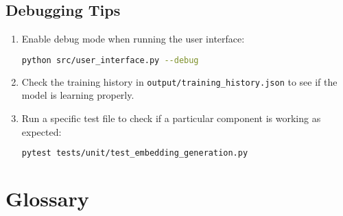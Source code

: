 \documentclass[12pt, a4paper, oneside]{book}
\begin{document}
\section{Debugging Tips}
\begin{enumerate}
    \item Enable debug mode when running the user interface:
    \begin{lstlisting}[language=bash]
python src/user_interface.py --debug
    \end{lstlisting}

    \item Check the training history in \texttt{output/training\_history.json} to see if the model is learning properly.

    \item Run a specific test file to check if a particular component is working as expected:
    \begin{lstlisting}[language=bash]
pytest tests/unit/test_embedding_generation.py
    \end{lstlisting}
\end{enumerate}

\appendix

\chapter{Glossary}
\end{document}
